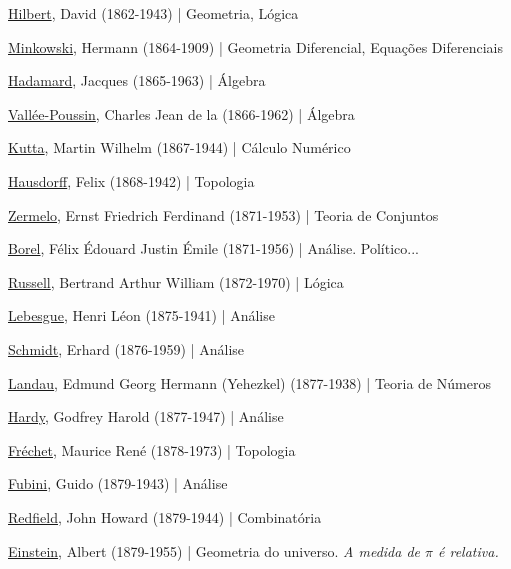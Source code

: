 \documentclass[12pt,a4paper]{article}
\begin{document}
			\href{http://pt.wikipedia.org/wiki/David_Hilbert}{Hilbert}, David (1862-1943) | Geometria, L\'ogica

			\href{http://pt.wikipedia.org/wiki/Hermann_Minkowski}{Minkowski}, Hermann (1864-1909) | Geometria Diferencial, Equa\c{c}\~oes Diferenciais

			\href{http://pt.wikipedia.org/wiki/Jacques_Hadamard}{Hadamard}, Jacques (1865-1963) | \'Algebra

			\href{http://en.wikipedia.org/wiki/Charles_Jean_de_la_Vall\%C3\%A9e-Poussin}{Vall\'ee-Poussin}, Charles Jean de la (1866-1962) | \'Algebra

			\href{http://en.wikipedia.org/wiki/Martin_Wilhelm_Kutta}{Kutta}, Martin Wilhelm (1867-1944) | C\'alculo Num\'erico

			\href{http://en.wikipedia.org/wiki/Felix_Hausdorff}{Hausdorff}, Felix (1868-1942) | Topologia

			\href{http://en.wikipedia.org/wiki/Ernst_Zermelo}{Zermelo}, Ernst Friedrich Ferdinand (1871-1953) | Teoria de Conjuntos

			\href{http://pt.wikipedia.org/wiki/\%C3\%89mile_Borel}{Borel}, F\'elix \'Edouard Justin \'Emile (1871-1956) | An\'alise. Pol\'itico...

			\href{http://en.wikipedia.org/wiki/Bertrand_Russell}{Russell}, Bertrand Arthur William (1872-1970) | L\'ogica

			\href{http://pt.wikipedia.org/wiki/Henri_Lebesgue}{Lebesgue}, Henri L\'eon (1875-1941) | An\'alise

			\href{http://en.wikipedia.org/wiki/Erhard_Schmidt}{Schmidt}, Erhard (1876-1959) | An\'alise

			\href{http://en.wikipedia.org/wiki/Edmund_Landau}{Landau}, Edmund Georg Hermann (Yehezkel) (1877-1938) | Teoria de N\'umeros

			\href{http://en.wikipedia.org/wiki/G._H._Hardy}{Hardy}, Godfrey Harold (1877-1947) | An\'alise

			\href{http://en.wikipedia.org/wiki/Frechet}{Fr\'echet}, Maurice Ren\'e (1878-1973) | Topologia

			\href{http://en.wikipedia.org/wiki/Guido_Fubini}{Fubini}, Guido (1879-1943) | An\'alise

			\href{http://en.wikipedia.org/wiki/John_Redfield}{Redfield}, John Howard (1879-1944) | Combinat\'oria

			\href{http://pt.wikipedia.org/wiki/Albert_Einstein}{Einstein}, Albert (1879-1955) | Geometria do universo. \emph{A medida de $ \pi $ \'e relativa.}
\end{document}
